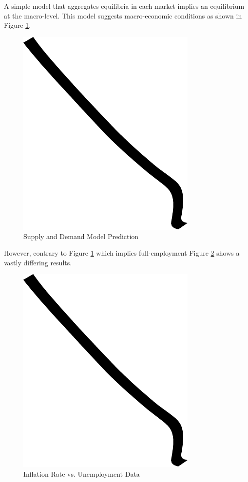 A simple model that aggregates equilibria in each market implies an equilibrium at the macro-level.
This model suggests macro-economic conditions as shown in Figure
\ref{fig:supply_and_demand_prediction}.

\begin{figure}
\centering
\includegraphics{img/example.pdf}
\caption{Supply and Demand Model Prediction}
\label{fig:supply_and_demand_prediction}
\end{figure}

However, contrary to Figure \ref{fig:supply_and_demand_prediction} which implies full-employment
Figure \ref{fig:ui_all_data} shows a vastly differing results.

\begin{figure}
\centering
\includegraphics{img/example.pdf}
\caption{Inflation Rate vs. Unemployment Data}
\label{fig:ui_all_data}
\end{figure}

